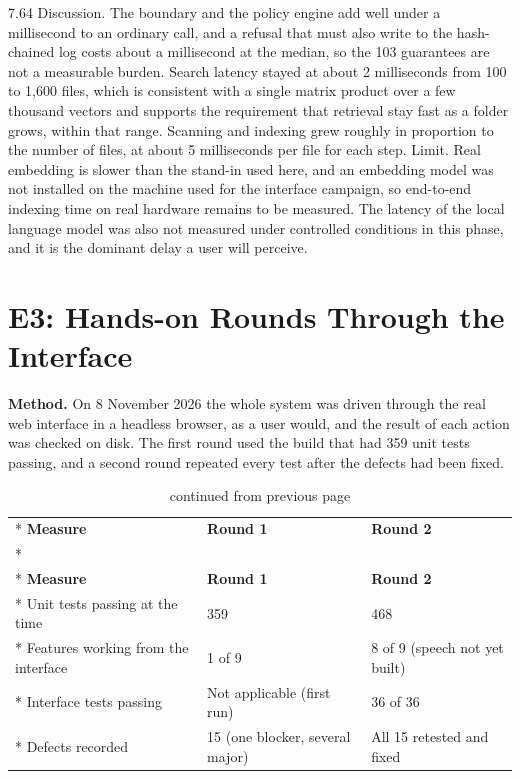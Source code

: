 \documentclass{FastFyp}
\begin{document}
7.64 Discussion. The boundary and the policy engine add well under a millisecond to an ordinary call, and a refusal that must also write to the hash-chained log costs about a millisecond at the median, so the 103 guarantees are not a measurable burden. Search latency stayed at about 2 milliseconds from 100 to 1,600 files, which is consistent with a single matrix product over a few thousand vectors and supports the requirement that retrieval stay fast as a folder grows, within that range. Scanning and indexing grew roughly in proportion to the number of files, at about 5 milliseconds per file for each step. Limit. Real embedding is slower than the stand-in used here, and an embedding model was not installed on the machine used for the interface campaign, so end-to-end indexing time on real hardware remains to be measured. The latency of the local language model was also not measured under controlled conditions in this phase, and it is the dominant delay a user will perceive.

\section{E3: Hands-on Rounds Through the Interface}
\textbf{Method.} On 8 November 2026 the whole system was driven through the real web interface in a headless browser, as a user would, and the result of each action was checked on disk. The first round used the build that had 359 unit tests passing, and a second round repeated every test after the defects had been fixed.

{
\begin{longtable}{|p{5.3cm}|p{3.7cm}|p{3.7cm}|}
\caption{Results of the two hands-on rounds.}\label{tab:rounds}\\*
\hline
\textbf{Measure} & \textbf{Round 1} & \textbf{Round 2} \\*
\hline
\endfirsthead
\caption[]{continued from previous page}\\*
\hline
\textbf{Measure} & \textbf{Round 1} & \textbf{Round 2} \\*
\hline
\endhead
\hline
Unit tests passing at the time & 359 & 468 \\*
\hline
Features working from the interface & 1 of 9 & 8 of 9 (speech not yet built) \\*
\hline
Interface tests passing & Not applicable (first run) & 36 of 36 \\*
\hline
Defects recorded & 15 (one blocker, several major) & All 15 retested and fixed \\
\hline
\end{longtable}
}
\end{document}
